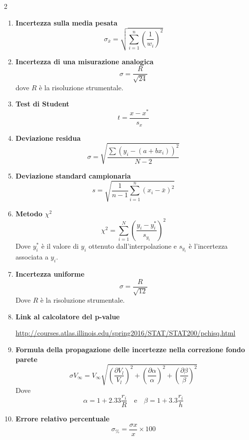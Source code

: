 \documentclass{article}
\begin{document}
\begin{multicols}{2}
\begin{enumerate}
    \item \textbf{Incertezza sulla media pesata}
    \[
    \sigma_{\bar{x}} = \sqrt{\sum_{i=1}^{n}\left(\frac{1}{w_i}\right)^2}
    \]

    \item \textbf{Incertezza di una misurazione analogica}
    \[
    \sigma = \frac{R}{\sqrt{24}}
    \]
    dove \( R \) è la risoluzione strumentale.

    \item \textbf{Test di Student}
    \[
    t = \frac{x - x^*}{s_x}
    \]

    \item \textbf{Deviazione residua}
    \[
    \sigma = \sqrt{\frac{\sum \left( y_i - (a + bx_i) \right)^2}{N-2}}
    \]

    \item \textbf{Deviazione standard campionaria}
    \[
    s = \sqrt{\frac{1}{n-1} \sum_{i=1}^{n} \left(x_i - \bar{x}\right)^2}
    \]

    \item \textbf{Metodo \(\chi^2\)}
    \[
    \chi^2 = \sum_{i=1}^{N} \left(\frac{y_i - y_i^*}{s_{y_i}}\right)^2
    \]
    Dove \( y_i^* \) è il valore di \( y_i \) ottenuto dall'interpolazione e \( s_{y_i} \) è l'incertezza associata a \( y_i \).

    \item \textbf{Incertezza uniforme}
    \[
    \sigma = \frac{R}{\sqrt{12}}
    \]
    Dove \( R \) è la risoluzione strumentale.

    \item \textbf{Link al calcolatore del p-value}
    
     \quad \url{http://courses.atlas.illinois.edu/spring2016/STAT/STAT200/pchisq.html}


    \item \textbf{Formula della propagazione delle incertezze nella correzione fondo parete}
    \[
    \sigma V_{\infty} = V_{\infty} \sqrt{\left( \frac{\partial V_l}{V_l} \right)^2 + \left( \frac{\partial \alpha}{\alpha} \right)^2 + \left( \frac{\partial \beta}{\beta} \right)^2}
    \]
    Dove
    \[
    \alpha = 1 + 2.33 \frac{r_i}{R} \quad \text{e} \quad \beta = 1 + 3.3 \frac{r_i}{h}
    \]

    \item \textbf{Errore relativo percentuale}
    \[
    \sigma_{\%} = \frac{\sigma x}{x} \times 100
    \]

\end{enumerate}



\end{multicols}
\end{document}
